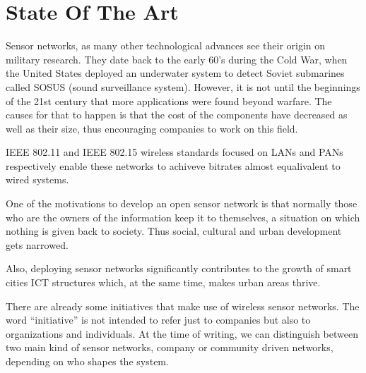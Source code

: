 \chapter{State Of The Art} %

\label{Chapter2} %



Sensor networks, as many other technological advances see their origin on military research. They date back to the early 60's during the Cold War, when the United States deployed an underwater system to detect Soviet submarines called SOSUS (sound surveillance system). However, it is not until the beginnings of the 21st century that more applications were found beyond warfare. The causes for that to happen is that the cost of the components have decreased as well as their size, thus encouraging companies to work on this field\citep{chong2003sensor}.

%
IEEE 802.11 and IEEE 802.15 wireless standards focused on LANs and PANs respectively enable these networks to achiveve bitrates almost equalivalent to wired systems.
%
%

One of the motivations to develop an open sensor network is that normally those who are the owners of the information keep it to themselves, a situation on which nothing is given back to society. Thus social, cultural and urban development  gets narrowed\citep{hollands2008will}.

Also, deploying sensor networks significantly contributes to the growth of smart cities ICT structures which, at the same time, makes urban areas thrive\citep{caragliu2009smart}.

There are already some initiatives that make use of wireless sensor networks. The word ``initiative'' is not intended to refer just to companies but also to organizations and individuals. At the time of writing, we can distinguish between two main kind of sensor networks, company or community driven networks, depending on who shapes the system.

